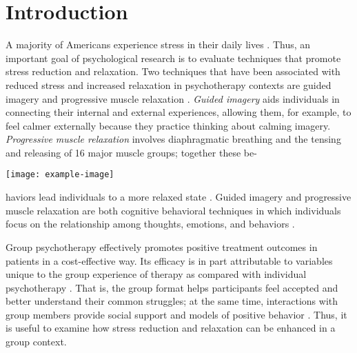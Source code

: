 \section*{Introduction}

A majority of Americans experience stress in their daily lives \citep{apa2017stress}. Thus, an important goal of psychological research is to evaluate techniques that promote stress reduction and relaxation. Two techniques that have been associated with reduced stress and increased relaxation in psychotherapy contexts are guided imagery and progressive muscle relaxation \citep{mcguigan2007relaxation}. \emph{Guided imagery} aids individuals in connecting their internal and external experiences, allowing them, for example, to feel calmer externally because they practice thinking about calming imagery. \emph{Progressive muscle relaxation} involves diaphragmatic breathing and the tensing and releasing of 16 major muscle groups; together these be-

\begin{Figure}
    \centering
    \texttt{[image: example-image]}
    \label{fig: small-image}
\end{Figure}

\noindent haviors lead individuals to a more relaxed state \citep{jacobson1938relaxation, trakhtenberg2008imagery}. Guided imagery and progressive muscle relaxation are both cognitive behavioral techniques \citep{yalom2005theory} in which individuals focus on the relationship among thoughts, emotions, and behaviors \citep{white2000introduction}.

Group psychotherapy effectively promotes positive treatment outcomes in patients in a cost-effective way. Its efficacy is in part attributable to variables unique to the group experience of therapy as compared with individual psychotherapy \citep{bottomley1996group, yalom2005theory}. That is, the group format helps participants feel accepted and better understand their common struggles; at the same time, interactions with group members provide social support and models of positive behavior \citep{yalom2005theory}. Thus, it is useful to examine how stress reduction and relaxation can be enhanced in a group context.

